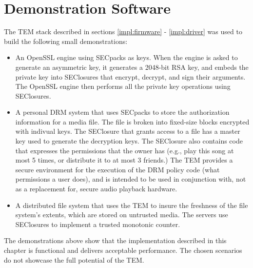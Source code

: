 \section{Demonstration Software}\label{impl:demos}
The TEM stack described in sections \ref{impl:firmware} - \ref{impl:driver} was
used to build the following small demonstrations:
\begin{itemize}
  \item An OpenSSL \cite{engelschall2001oos} engine using SECpacks as keys.
  When the engine is asked to generate an asymmetric key, it generates a
  2048-bit RSA key, and embeds the private key into SEClosures that encrypt,
  decrypt, and sign their arguments. The OpenSSL engine then performs all the 
  private key operations using SEClosures.
  \item A personal DRM system that uses SECpacks to store the authorization
  information for a media file. The file is broken into fixed-size blocks
  encrypted with indivual keys. The SEClosure that grants access to a file has a 
  master key used to generate the decryption keys. The SEClosure also contains
  code that expresses the permissions that the owner has (e.g., play this song at
  most 5 times, or distribute it to at most 3 friends.) The TEM provides a secure
  environment for the execution of the DRM policy code (what permissions a user
  does), and is intended to be used in conjunction with, not as a replacement
  for, secure audio playback hardware.
  \item A distributed file system that uses the TEM to insure the freshness of
  the file system's extents, which are stored on untrusted media. The servers
  use SEClosures to implement a trusted monotonic counter.
\end{itemize}

The demonstrations above show that the implementation described in this chapter
is functional and delivers acceptable performance. The chosen scenarios do not
showcase the full potential of the TEM.
